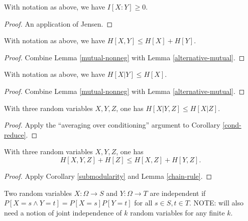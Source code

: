 \begin{lemma}\label{mutual-nonneg}  With notation as above, we have $I[X:Y] \geq 0$.
\end{lemma}

\begin{proof}  An application of Jensen.
\end{proof}

\begin{corollary}[Subadditivity]\label{subadditive}  With notation as above, we have $H[X,Y] \leq H[X] + H[Y]$.
\end{corollary}

\begin{proof}  Combine Lemma \ref{mutual-nonneg} with Lemma \ref{alternative-mutual}.
\end{proof}

\begin{corollary}\label{cond-reduce}  With notation as above, we have $H[X|Y] \leq H[X]$.
\end{corollary}

\begin{proof}  Combine Lemma \ref{mutual-nonneg} with Lemma \ref{alternative-mutual}.
\end{proof}

\begin{corollary}[Submodularity]\label{submodularity} With three random variables $X,Y,Z$, one has $H[X|Y,Z] \leq H[X|Z]$.
\end{corollary}

\begin{proof} Apply the ``averaging over conditioning'' argument to Corollary \ref{cond-reduce}.
\end{proof}

\begin{corollary}\label{alt-submodularity} With three random variables $X,Y,Z$, one has
  $$ H[X,Y,Z] + H[Z] \leq H[X,Z] + H[Y,Z].$$
\end{corollary}

\begin{proof}  Apply Corollary \ref{submodularity} and Lemma \ref{chain-rule}.
\end{proof}

\begin{definition}\label{independent-def}
Two random variables $X: \Omega \to S$ and $Y: \Omega \to T$ are independent if $P[ X = s \wedge Y = t] = P[X=s] P[Y=t]$ for all $s \in S, t \in T$.  NOTE: will also need a notion of joint independence of $k$ random variables for any finite $k$.
\end{definition}

